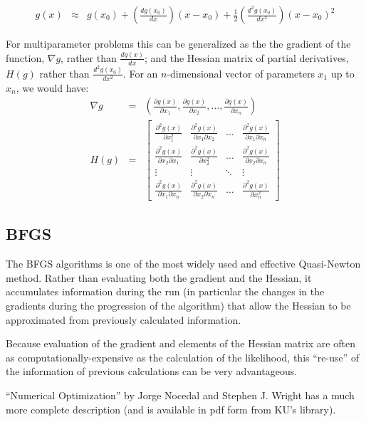 \documentclass[11pt]{article}
\begin{document}
\begin{eqnarray*}\nonumber
	g(x) & \approx &g(x_0) + \left(\frac{d g(x_0)}{d x}\right)(x-x_0) + \frac{1}{2}\left(\frac{d^2 g(x_0)}{d x^2}\right)(x-x_0)^2
\end{eqnarray*}

For multiparameter problems this can be generalized as the the gradient of the function, $\nabla g$, rather than $\frac{d g(x)}{dx}$; and the Hessian matrix of partial derivatives, $H(g)$ rather than $\frac{d^2 g(x_0)}{d x^2}$.
For an $n$-dimensional vector of parameters $x_1$ up to $x_n$, we would have:
\begin{eqnarray*}\nonumber
	\nabla g & = & \left(\frac{\partial g(x)}{\partial x_1}, \frac{\partial g(x)}{\partial x_2},\ldots, \frac{\partial g(x)}{\partial x_n}\right)\\
	H(g) & = & 
\left[
\begin{array}{cccc}
 \frac{\partial^2 g(x)}{\partial x_1^2} & \frac{\partial^2 g(x)}{\partial x_1\partial x_2}  & \ldots &  \frac{\partial^2 g(x)}{\partial x_1\partial x_n} \\
  \frac{\partial^2 g(x)}{\partial x_2\partial x_1} & \frac{\partial^2 g(x)}{\partial x_2^2}  &  \ldots &  \frac{\partial^2 g(x)}{\partial x_2\partial x_n}\\
 \vdots &  \vdots & \ddots  & \vdots\\
  \frac{\partial^2 g(x)}{\partial x_1\partial x_n} &  \frac{\partial^2 g(x)}{\partial x_2\partial x_n}&\ldots & \frac{\partial^2 g(x)}{\partial x_n^2}
\end{array}
\right]
\end{eqnarray*}

\subsection*{BFGS}
The BFGS algorithms is one of the most widely used and effective Quasi-Newton method.  
Rather than evaluating both the gradient and the Hessian, it accumulates information during the run (in particular the changes in the gradients during the progression of the algorithm) that allow the Hessian to be approximated from previously calculated information.

Because evaluation of the gradient and elements of the Hessian matrix are often as computationally-expensive as the calculation of the likelihood, this ``re-use'' of the information of previous calculations can be very advantageous.

``Numerical Optimization'' by Jorge Nocedal and Stephen J. Wright  has a much more complete description (and is available in pdf form from KU's library).
\end{document}
